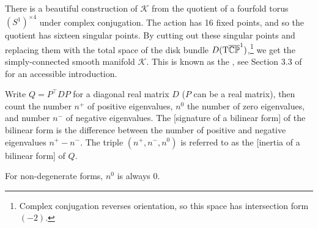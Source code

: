 \begin{remark}\label{rmk:kummer-construction}
	There is a beautiful construction of $\mathcal{K}$ from the quotient of a fourfold torus $(S^1)^{\times 4}$ under complex conjugation. The action has 16 fixed points, and so the quotient has sixteen singular points. By cutting out these singular points and replacing them with the total space of the disk bundle ${D}(\mathrm{T} \overline{\mathbb{CP}}^1)$,\footnote{Complex conjugation reverses orientation, so this space has intersection form $(-2)$.} we get the simply-connected smooth manifold $\mathcal{K}$. This is known as the , see Section 3.3 of \cite{scorpan2005wild} for an accessible introduction.
\end{remark}

\begin{definition}
	Write $Q=P^\intercal D P$ for a diagonal real matrix $D$ ($P$ can be a real matrix), then count the number $n^+$ of positive eigenvalues, $n^0$ the number of zero eigenvalues, and number $n^-$ of negative eigenvalues. The [signature of a bilinear form] of the bilinear form is the difference between the number of positive and negative eigenvalues $n^+-n^-$.
	The triple $(n^+, n^-, n^0)$ is referred to as the [inertia of a bilinear form] of $Q$.
\end{definition}

\begin{remark}
	For non-degenerate forms, $n^0$ is always $0$.
\end{remark}

